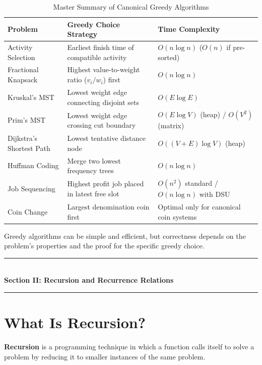 \begin{table}[htbp]
\centering
\caption{Master Summary of Canonical Greedy Algorithms}
\label{tab:greedy_summary}
\begin{tabularx}{\textwidth}{p{3.8cm} X p{4.5cm}}
\toprule
\textbf{Problem} & \textbf{Greedy Choice Strategy} & \textbf{Time Complexity} \\
\midrule
Activity Selection & Earliest finish time of compatible activity & $O(n \log n)$ ($O(n)$ if pre-sorted) \\
Fractional Knapsack & Highest value-to-weight ratio ($v_i/w_i$) first & $O(n \log n)$ \\
Kruskal's MST & Lowest weight edge connecting disjoint sets & $O(E \log E)$ \\
Prim's MST & Lowest weight edge crossing cut boundary & $O(E \log V)$ (heap) / $O(V^2)$ (matrix) \\
Dijkstra's Shortest Path & Lowest tentative distance node & $O((V+E)\log V)$ (heap) \\
Huffman Coding & Merge two lowest frequency trees & $O(n \log n)$ \\
Job Sequencing & Highest profit job placed in latest free slot & $O(n^2)$ standard / $O(n \log n)$ with DSU \\
Coin Change & Largest denomination coin first & Optimal only for canonical coin systems \\
\bottomrule
\end{tabularx}
\end{table}

Greedy algorithms can be simple and efficient, but correctness depends on the problem's properties and the proof for the specific greedy choice.


\newpage
\begin{center}
\vspace{0.5em}
{\color{primary}\rule{0.45\textwidth}{1.2pt}}\\[4pt]
{\Large\bfseries\color{primary} Section II: Recursion and Recurrence Relations}\\[2pt]
{\color{primary}\rule{0.45\textwidth}{1.2pt}}
\vspace{0.5em}
\end{center}


\section{What Is Recursion?}

\textbf{Recursion} is a programming technique in which a function calls itself to solve a problem by reducing it to smaller instances of the same problem.

